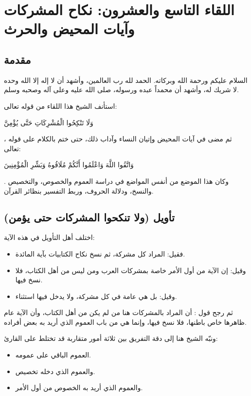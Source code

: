 \chapter{اللقاء التاسع والعشرون: نكاح المشركات وآيات المحيض والحرث}

\section{مقدمة}
السلام عليكم ورحمة الله وبركاته. الحمد لله رب العالمين، وأشهد أن لا إله إلا الله وحده لا شريك له، وأشهد أن محمداً عبده ورسوله، صلى الله عليه وعلى آله وصحبه وسلم.

استأنف الشيخ هذا اللقاء من قوله تعالى: \begin{ayah}وَلَا تَنْكِحُوا الْمُشْرِكَاتِ حَتَّى يُؤْمِنَّ\end{ayah}، ثم مضى في آيات المحيض وإتيان النساء وآداب ذلك، حتى ختم بالكلام على قوله تعالى: \begin{ayah}وَاتَّقُوا اللَّهَ وَاعْلَمُوا أَنَّكُمْ مُلَاقُوهُ وَبَشِّرِ الْمُؤْمِنِينَ\end{ayah}. وكان هذا الموضع من أنفس المواضع في دراسة العموم والخصوص، والتخصيص والنسخ، ودلالة الحروف، وربط التفسير بنظائر القرآن.

\separator

\section{تأويل (ولا تنكحوا المشركات حتى يؤمن)}
 اختلف أهل التأويل في هذه الآية:
\begin{itemize}
    \item فقيل: المراد كل مشركة، ثم نسخ نكاح الكتابيات بآية المائدة.
    \item وقيل: إن الآية من أول الأمر خاصة بمشركات العرب ومن ليس من أهل الكتاب، فلا نسخ فيها.
    \item وقيل: بل هي عامة في كل مشركة، ولا يدخل فيها استثناء.
\end{itemize}

ثم رجح  قول : أن المراد بالمشركات هنا من لم يكن من أهل الكتاب، وأن الآية عام ظاهرها خاص باطنها، فلا نسخ فيها، وإنما هي من باب العموم الذي أريد به بعض أفراده.

ونبّه الشيخ هنا إلى دقة التفريق بين ثلاثة أمور متقاربة قد تختلط على القارئ:
\begin{itemize}
    \item العموم الباقي على عمومه.
    \item والعموم الذي دخله تخصيص.
    \item والعموم الذي أريد به الخصوص من أول الأمر.
\end{itemize}

